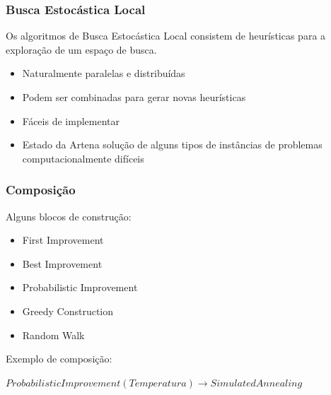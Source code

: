 \documentclass[10pt, compress]{beamer}
\begin{document}
\begin{frame}[fragile]
\begin{columns}
\begin{figure}[h]
        \end{figure}
    \end{columns}
    \let\thefootnote\relax{}
\end{frame}

\begin{frame}[fragile]
    \frametitle{Busca Estocástica Local}
    Os algoritmos de Busca Estocástica Local consistem de
    \alert{heurísticas} para a exploração de um espaço de busca.
    \pause
    \begin{itemize}
        \item Naturalmente \alert{paralelas} e \alert{distribuídas}
        \item Podem ser \alert{combinadas} para gerar novas heurísticas
            \pause
        \item \alert{Fáceis} de implementar
            \pause
        \item \alert{Estado da Arte}\footnotemark[1]\footnotemark[2] na solução
            de \alert{alguns tipos} de instâncias de problemas computacionalmente
            difíceis
    \end{itemize}
\end{frame}

\begin{frame}[fragile]
    \frametitle{Composição}
    Alguns \alert{blocos de construção}:
    \begin{itemize}
        \item First Improvement
        \item Best Improvement
        \item Probabilistic Improvement
        \item Greedy Construction
        \item Random Walk
    \end{itemize}
            \pause
    Exemplo de \alert{composição}:

    $ProbabilisticImprovement(Temperatura) \rightarrow SimulatedAnnealing$
\end{frame}
\end{document}

